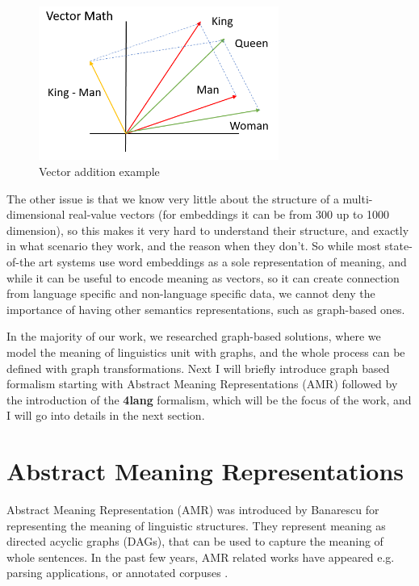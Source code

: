 \begin{figure}[h!]
	\centering
	\includegraphics[width=0.7\textwidth]{figures/vecs}
	\caption{Vector addition example \cite{embeddings}}
	\label{fig:vecs}
\end{figure}

The other issue is that we know very little about the structure of a multi-dimensional real-value vectors (for embeddings it can be from 300 up to 1000 dimension), so this makes it very hard to understand their structure, and exactly in what scenario they work, and the reason when they don't. So while most state-of-the art systems use word embeddings as a sole representation of meaning, and while it can be useful to encode meaning as vectors, so it can create connection from language specific and non-language specific data, we cannot deny the importance of having other semantics representations, such as graph-based ones. 

In the majority of our work, we researched graph-based solutions, where we model the meaning of linguistics unit with graphs, and the whole process can be defined with graph transformations. Next I will briefly introduce graph based formalism starting with Abstract Meaning Representations (AMR) followed by the introduction of the \textbf{4lang} formalism, which will be the focus of the work, and I will go into details in the next section.

\section{Abstract Meaning Representations}
Abstract Meaning Representation (AMR) was introduced by Banarescu\cite{Banarescu:2013} for representing the meaning of linguistic structures. They represent meaning as directed acyclic graphs (DAGs), that can be used to capture the meaning of whole sentences. In the past few years, AMR related works have appeared e.g. parsing applications, or annotated corpuses \cite{Banarescu:2013, OGorman2018AMRBT, DAC:2017}.

